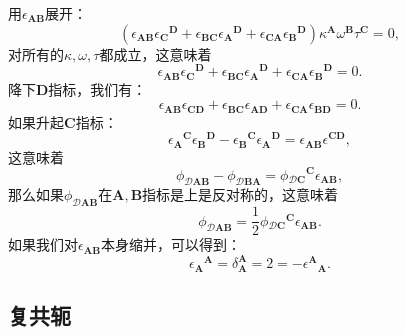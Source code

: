 用$\epsilon _{\boldsymbol{AB}}$展开：
\begin{equation*}
	(\epsilon _{\boldsymbol{AB}} \epsilon {_{\boldsymbol{C}}}^{\boldsymbol{D}} +\epsilon _{\boldsymbol{BC}} \epsilon {_{\boldsymbol{A}}}^{\boldsymbol{D}} +\epsilon _{\boldsymbol{CA}} \epsilon {_{\boldsymbol{B}}}^{\boldsymbol{D}} )\kappa ^{\boldsymbol{A}} \omega ^{\boldsymbol{B}} \tau ^{\boldsymbol{C}} =0,
\end{equation*}
对所有的$\kappa ,\omega ,\tau $都成立，这意味着
\begin{equation*}
	\epsilon _{\boldsymbol{AB}} \epsilon {_{\boldsymbol{C}}}^{\boldsymbol{D}} +\epsilon _{\boldsymbol{BC}} \epsilon {_{\boldsymbol{A}}}^{\boldsymbol{D}} +\epsilon _{\boldsymbol{CA}} \epsilon {_{\boldsymbol{B}}}^{\boldsymbol{D}} =0.
\end{equation*}
降下$\boldsymbol{D}$指标，我们有：
\begin{equation*}
	\epsilon _{\boldsymbol{AB}} \epsilon _{\boldsymbol{CD}} +\epsilon _{\boldsymbol{BC}} \epsilon _{\boldsymbol{AD}} +\epsilon _{\boldsymbol{CA}} \epsilon _{\boldsymbol{BD}} =0.
\end{equation*}
如果升起$\boldsymbol{C}$指标：
\begin{equation*}
	\epsilon {_{\boldsymbol{A}}}^{\boldsymbol{C}} \epsilon {_{\boldsymbol{B}}}^{\boldsymbol{D}} -\epsilon {_{\boldsymbol{B}}}^{\boldsymbol{C}} \epsilon {_{\boldsymbol{A}}}^{\boldsymbol{D}} =\epsilon _{\boldsymbol{AB}} \epsilon ^{\boldsymbol{CD}} ,
\end{equation*}
这意味着
\begin{equation*}
	\phi _{\mathcal{D}\boldsymbol{AB}} -\phi _{\mathcal{D}\boldsymbol{BA}} =\phi {_{\mathcal{D}\boldsymbol{C}}}^{\boldsymbol{C}} \epsilon _{\boldsymbol{AB}} ,
\end{equation*}
那么如果$\phi _{\mathcal{D}\boldsymbol{AB}}$在$\boldsymbol{A} ,\boldsymbol{B}$指标是上是反对称的，这意味着
\begin{equation*}
	\phi _{\mathcal{D}\boldsymbol{AB}} =\frac{1}{2} \phi {_{\mathcal{D}\boldsymbol{C}}}^{\boldsymbol{C}} \epsilon _{\boldsymbol{AB}} .
\end{equation*}
如果我们对$\epsilon _{\boldsymbol{AB}}$本身缩并，可以得到：
\begin{equation*}
	\epsilon {_{\boldsymbol{A}}}^{\boldsymbol{A}} =\delta _{\boldsymbol{A}}^{\boldsymbol{A}} =2=-\epsilon ^{\boldsymbol{A}}{}_{\boldsymbol{A}} .
\end{equation*}
\subsection{复共轭}

